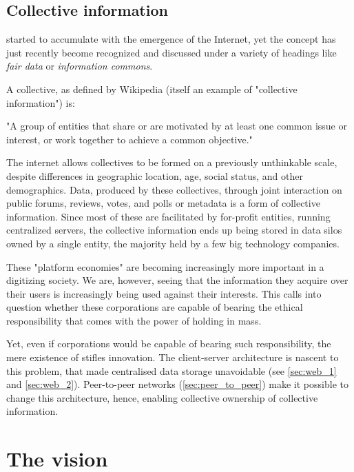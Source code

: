 \subsection{Collective information}\label{sec:collective_information}

 started to accumulate with the emergence of the Internet, yet the concept has just recently become recognized and discussed under a variety of headings like \emph{fair data} or \emph{information commons}.

A collective, as defined by Wikipedia (itself an example of "collective information") is:
\begin{displayquote}
"A group of entities that share or are motivated by at least one common issue or interest, or work together to achieve a common objective." 
\end{displayquote}
The internet allows collectives to be formed on a previously unthinkable scale, despite differences in geographic location, age, social status, and other demographics. Data,  produced by these collectives, through joint interaction on public forums, reviews, votes, and polls or metadata is a form of collective information. Since most of these are facilitated by for-profit entities, running centralized servers, the collective information ends up being stored in data silos owned by a single entity, the majority held by a few big technology companies.

These "platform economies" are becoming increasingly more important in a digitizing society. We are, however, seeing that the information they acquire over their users is increasingly being used against their interests. This calls into question whether these corporations are capable of bearing the ethical responsibility that comes with the power of holding  in mass.

Yet, even if corporations would be capable of bearing such responsibility, the mere existence of  stifles innovation. The client-server architecture is nascent to this problem, that made centralised data storage unavoidable (see \ref{sec:web_1} and \ref{sec:web_2}). Peer-to-peer networks (\ref{sec:peer_to_peer}) make it possible to change this architecture, hence, enabling collective ownership of collective information. 


\section{The vision}\label{sec:vision}

